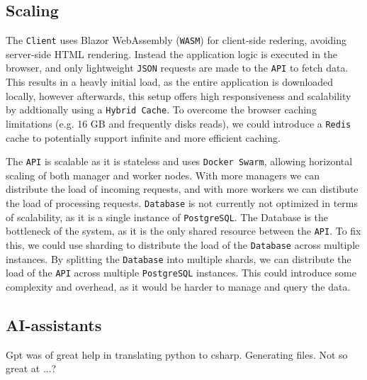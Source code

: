 \subsection{Scaling}
The \texttt{Client} uses Blazor WebAssembly (\texttt{WASM}) for client-side redering, avoiding server-side 
HTML rendering.
Instead the application logic is executed in the browser, and only lightweight 
\texttt{JSON} requests are made to the \texttt{API} to fetch data.
This results in a heavly initial load, as the entire application is downloaded 
locally, however afterwards, 
this setup offers high responsiveness and scalability by addtionally using 
a \texttt{Hybrid Cache}.
To overcome the browser caching limitations (e.g. 16 GB and frequently disks 
reads), we could introduce a \texttt{Redis} cache to potentially support 
infinite and more efficient caching.

The \texttt{API} is scalable as it is stateless and uses \texttt{Docker Swarm}, 
allowing horizontal scaling of both manager and worker nodes.
With more managers we can distribute the load of incoming requests,
and with more workers we can distibute the load of processing requests.
\texttt{Database} is not currently not optimized in terms of scalability, 
as it is a single instance of \texttt{PostgreSQL}.
The Database is the bottleneck of the system, as it is the only shared 
resource between the \texttt{API}.
To fix this, we could use sharding to distribute the load of the \texttt{Database} 
across multiple instances.
By splitting the \texttt{Database} into multiple shards, we can distribute 
the load of the \texttt{API} across multiple \texttt{PostgreSQL} instances.
This could introduce some complexity and overhead, as it would be harder 
to manage and query the data.

\subsection{AI-assistants}

Gpt was of great help in translating python to csharp.
Generating files.
Not so great at ...?